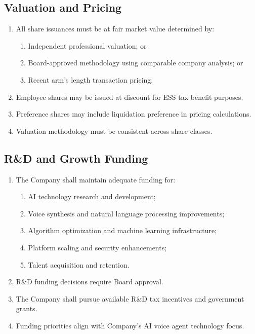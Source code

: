 \subsection{Valuation and Pricing}
\begin{enumerate}[label=(\alph*)]
\item All share issuances must be at fair market value determined by:
    \begin{enumerate}[label=(\roman*)]
    \item Independent professional valuation; or
    \item Board-approved methodology using comparable company analysis; or
    \item Recent arm's length transaction pricing.
    \end{enumerate}
\item Employee shares may be issued at discount for ESS tax benefit purposes.
\item Preference shares may include liquidation preference in pricing calculations.
\item Valuation methodology must be consistent across share classes.
\end{enumerate}

\subsection{R\&D and Growth Funding}
\begin{enumerate}[label=(\alph*)]
\item The Company shall maintain adequate funding for:
    \begin{enumerate}[label=(\roman*)]
    \item AI technology research and development;
    \item Voice synthesis and natural language processing improvements;
    \item Algorithm optimization and machine learning infrastructure;
    \item Platform scaling and security enhancements;
    \item Talent acquisition and retention.
    \end{enumerate}
\item R\&D funding decisions require Board approval.
\item The Company shall pursue available R\&D tax incentives and government grants.
\item Funding priorities align with Company's AI voice agent technology focus.
\end{enumerate}

